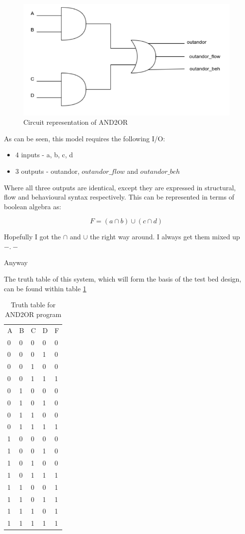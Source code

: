 \documentclass[12pt,a4paper]{article}
\begin{document}
\begin{figure}[H]
    \centering
    \includegraphics[scale=0.5]{images/cct.png}
    \caption{Circuit representation of AND2OR}
    \label{fig:cct}
\end{figure}

As can be seen, this model requires the following I/O:

\begin{itemize}
  \item 4 inputs - a, b, c, d
  \item 3 outputs - outandor, $outandor \_ flow$ and $outandor \_ beh$
\end{itemize}

Where all three outputs are identical, except they are expressed in structural, flow and behavioural syntax respectively. This can be represented in terms of boolean algebra as:

\[F = (a \cap b) \cup (c \cap d)\]

Hopefully I got the $\cap$ and $\cup$ the right way around. I always get them mixed up $-.-$

Anyway

The truth table of this system, which will form the basis of the test bed design, can be found within table \ref{tab:truth_table}

\begin{table}[H]
\centering
\begin{tabular}{lllll}
A & B & C & D & F \\
0 & 0 & 0 & 0 & 0 \\
0 & 0 & 0 & 1 & 0 \\
0 & 0 & 1 & 0 & 0 \\
0 & 0 & 1 & 1 & 1 \\
0 & 1 & 0 & 0 & 0 \\
0 & 1 & 0 & 1 & 0 \\
0 & 1 & 1 & 0 & 0 \\
0 & 1 & 1 & 1 & 1 \\
1 & 0 & 0 & 0 & 0 \\
1 & 0 & 0 & 1 & 0 \\
1 & 0 & 1 & 0 & 0 \\
1 & 0 & 1 & 1 & 1 \\
1 & 1 & 0 & 0 & 1 \\
1 & 1 & 0 & 1 & 1 \\
1 & 1 & 1 & 0 & 1 \\
1 & 1 & 1 & 1 & 1
\end{tabular}
\caption{Truth table for AND2OR program}
\label{tab:truth_table}
\end{table}
\end{document}
